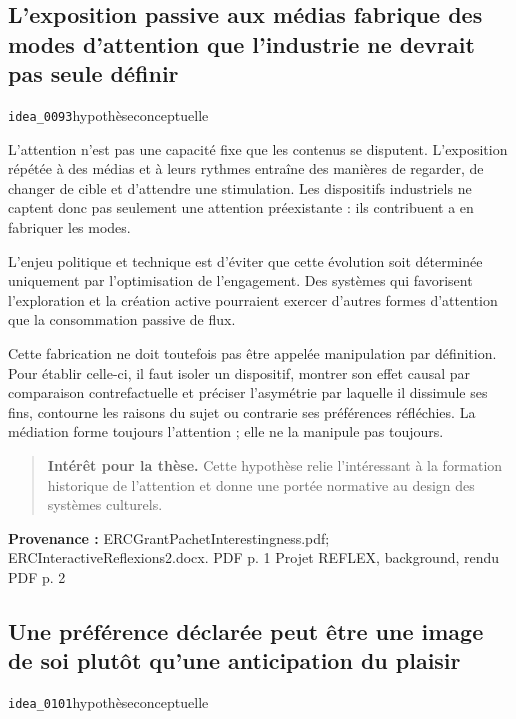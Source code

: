 \documentclass[10pt,a4paper]{article}
\begin{document}
\subsection{L'exposition passive aux médias fabrique des modes d'attention que l'industrie ne devrait pas seule définir}
{\small\color{metadata} \texttt{idea\_0093}\quad\textbullet\quad hypothèse\quad\textbullet\quad conceptuelle\par}

L'attention n'est pas une capacité fixe que les contenus se disputent. L'exposition répétée à des médias et à leurs rythmes entraîne des manières de regarder, de changer de cible et d'attendre une stimulation. Les dispositifs industriels ne captent donc pas seulement une attention préexistante : ils contribuent a en fabriquer les modes.

L'enjeu politique et technique est d'éviter que cette évolution soit déterminée uniquement par l'optimisation de l'engagement. Des systèmes qui favorisent l'exploration et la création active pourraient exercer d'autres formes d'attention que la consommation passive de flux.

Cette fabrication ne doit toutefois pas être appelée manipulation par définition. Pour établir celle-ci, il faut isoler un dispositif, montrer son effet causal par comparaison contrefactuelle et préciser l'asymétrie par laquelle il dissimule ses fins, contourne les raisons du sujet ou contrarie ses préférences réfléchies. La médiation forme toujours l'attention ; elle ne la manipule pas toujours.

\begin{quote}
\textbf{Intérêt pour la thèse.} Cette hypothèse relie l'intéressant à la formation historique de l'attention et donne une portée normative au design des systèmes culturels.
\end{quote}
{\footnotesize\color{metadata}\textbf{Provenance :} ERCGrantPachetInterestingness.pdf; ERCInteractiveReflexions2.docx. PDF p. 1 Projet REFLEX, background, rendu PDF p. 2\par}

\subsection{Une préférence déclarée peut être une image de soi plutôt qu'une anticipation du plaisir}
{\small\color{metadata} \texttt{idea\_0101}\quad\textbullet\quad hypothèse\quad\textbullet\quad conceptuelle\par}
\end{document}
